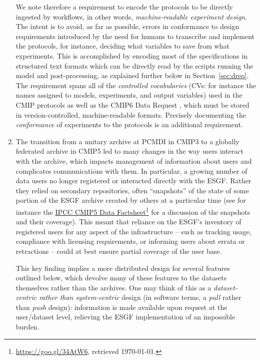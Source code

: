 \documentclass[gmd,manuscript]{copernicus}
\newcommand{\urlref}[2] {\href{#1}{#2}\footnote{\url{#1}, retrieved \today.}}
\begin{document}
\begin{enumerate}
  We note therefore a requirement to encode the protocols to be
  directly ingested by workflows, in other words,
  \emph{machine-readable experiment design}.
  The intent is to avoid, as far as possible, errors in conformance to
  design requirements introduced by the need for humans to transcribe
  and implement the protocols, for instance, deciding what variables
  to save from what experiments. This is accomplished by encoding most
  of the specifications in structured text formats which can be
  directly read by the scripts running the model and post-processing,
  as explained further below in Section~\ref{sec:dreq}. The
  requirement spans all of the \emph{controlled vocabularies} (CVs:
  for instance the names assigned to models, experiments, and output
  variables) used in the CMIP protocols as well as the CMIP6 Data
  Request \citep{ref:juckesetal2015}, which must be stored in
  version-controlled, machine-readable formats. Precisely documenting
  the \emph{conformance} of experiments to the protocols
  \citep{ref:lawrenceetal2012} is an additional requirement.
\item\label{snap} The transition from a unitary archive at PCMDI in
  CMIP3 to a globally federated archive in CMIP5 led to many changes
  in the way users interact with the archive, which impacts management
  of information about users and complicates communications with them.
  In particular, a growing number of data users no longer registered or
  interacted directly with the ESGF. Rather they relied on secondary
  repositories, often ``snapshots'' of the state of some portion of
  the ESGF archive created by others at a particular time (see for
  instance the \urlref{https://goo.gl/34AtW6}{IPCC CMIP5 Data
    Factsheet}
  for a discussion of the snapshots and their coverage). This meant
  that reliance on the ESGF's inventory of registered users for any
  aspect of the infrastructure -- such as tracking usage, compliance
  with licensing requirements, or informing users about errata or
  retractions -- could at best ensure partial coverage of the user
  base.

  This key finding implies a more distributed design for several
  features outlined below, which devolve many of these features to the
  datasets themselves rather than the archives. One may think of this
  as a \emph{dataset-centric rather than system-centric} design (in
  software terms, a \emph{pull} rather than \emph{push} design):
  information is made available upon request at the user/dataset
  level, relieving the ESGF implementation of an impossible burden.
\end{enumerate}
\end{document}
